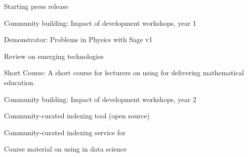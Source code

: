 \begin{workpackage}

\begin{wpdelivs}
\begin{wpdeliv}[due=6,id=press-release-1,dissem=PU,nature=DEC,lead=PS]{Starting press release}\end{wpdeliv}
 \begin{wpdeliv}[due=12,id=workshops-1,dissem=PU,nature=R,lead=PS]{Community building: Impact of development workshops, year 1}\end{wpdeliv}
  \begin{wpdeliv}[due=12,id=ibook3a,dissem=PU,nature=DEM,lead=US]{Demonstrator: Problems in Physics with Sage v1} \end{wpdeliv}
  \begin{wpdeliv}[due=12,id=techno,dissem=PU,nature=R,lead=PS]{Review on emerging technologies} \end{wpdeliv}
   \begin{wpdeliv}[due=18,id=short-course,dissem=PU,nature=DEC,lead=USH]{Short Course: A short course for lecturers on using \TheProject for delivering mathematical education.}\end{wpdeliv}
\begin{wpdeliv}[due=24,id=workshops-2,dissem=PU,nature=R,lead=PS]{Community building: Impact of development workshops, year 2}\end{wpdeliv}  
\begin{wpdeliv}[due=24,id=ils-tool,dissem=PU,nature=P,lead=UV]{Community-curated
     indexing tool (open source)} \end{wpdeliv}
      \begin{wpdeliv}[due=24,id=ils-service,dissem=PU,nature=DEM,lead=UV]{Community-curated
     indexing service for \TheProject} \end{wpdeliv}
      \begin{wpdeliv}[due=24,id=datascience-course,dissem=PU,nature=DEC,lead=USH]{Course material on using \TheProject in data science} \end{wpdeliv}

\end{wpdelivs}
\end{workpackage}
